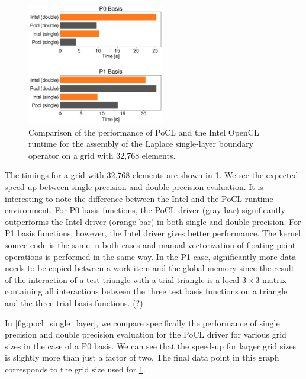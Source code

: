 \begin{figure}
	\center
	\includegraphics[width=6cm]{img/intel_pocl_laplace_comp.pdf}
	\caption{Comparison of the performance of PoCL and the Intel OpenCL runtime for the assembly of the Laplace single-layer boundary operator on a grid with 32,768 elements.}
	\label{fig:intel_pocl_laplace_cmp}
\end{figure}

The timings for a grid with 32,768 elements are shown in \cref{fig:intel_pocl_laplace_cmp}. We see the expected speed-up between single precision and double precision evaluation. It is interesting to note the difference between the Intel and the PoCL runtime environment. For P0 basis functions, the PoCL driver (gray bar) significantly outperforms the Intel driver (orange bar) in both single and double precision. For P1 basis functions, however, the Intel driver gives better performance. The kernel source code is the same in both cases and manual vectorization of floating point operations is performed in the same way. In the P1 case, significantly more data needs to be copied between a work-item and the global memory since the result of the interaction of a test triangle with a trial triangle is a local $3\times 3$ matrix containing all interactions between the three test basis functions on a triangle and the three trial basis functions. {\color{red}(?)}

In \cref{fig:pocl_single_layer}, we compare specifically the performance of single precision and double precision evaluation for the PoCL driver for various grid sizes in the case of a P0 basis. We can see that the speed-up for larger grid sizes is slightly more than just a factor of two. The final data point in this graph corresponds to the grid size used for \cref{fig:intel_pocl_laplace_cmp}.

